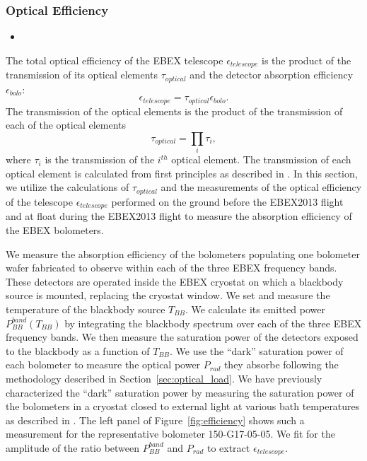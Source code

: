 \documentclass[../EBEXPaper2.tex]{subfiles}
\begin{document}
\subsubsection{Optical Efficiency}
\label{sec:optical_efficiency}

\begin{itemize}
\item {}
\end{itemize}

The total optical efficiency of the \ac{EBEX} telescope $\epsilon_{telescope}$ is the product of the transmission of its optical elements $\tau_{optical}$ and the detector absorption efficiency $\epsilon_{bolo}$:
\begin{equation}
\epsilon_{telescope} = \tau_{optical} \epsilon_{bolo}.
\label{eq:total_efficiency}
\end{equation}
The  transmission of the optical elements is the product of the transmission of each of the optical elements
\begin{equation}
\tau_{optical} = \prod_i \tau_i,
\label{eq:total_efficiency}
\end{equation}
where $\tau_i$ is the transmission of the $i^{th}$ optical element.
The transmission of each optical element is calculated from first principles as described in \citep{aubin_thesis}.
In this section, we utilize the calculations of $\tau_{optical}$ and the measurements of the optical efficiency of the telescope $\epsilon_{telescope}$ performed on the ground before the \ac{EBEX2013} flight and at float during the \ac{EBEX2013} flight to measure the absorption efficiency of the \ac{EBEX} bolometers.



We measure the absorption efficiency of the bolometers populating one bolometer wafer fabricated to observe within each of the three \ac{EBEX} frequency bands.
These detectors are operated inside the \ac{EBEX} cryostat on which a blackbody source is mounted, replacing the cryostat window.
We set and measure the temperature of the blackbody source $T_{BB}$.
We calculate its emitted power $P_{BB}^{band} (T_{BB})$ by integrating the blackbody spectrum over each of the three \ac{EBEX} frequency bands.
We then measure the saturation power of the detectors exposed to the blackbody as a function of $T_{BB}$.
We use the ``dark'' saturation power of each bolometer to measure the optical power $P_{rad}$ they absorbe following the methodology described in Section~\ref{sec:optical_load}.
We have previously characterized the ``dark'' saturation power by measuring the saturation power of the bolometers in a cryostat closed to external light at various bath temperatures as described in \citep{Aubin_TESReadout2010}.
The left panel of Figure~\ref{fig:efficiency} shows such a measurement for the representative bolometer 150-G17-05-05.
We fit for the amplitude of the ratio between $P_{BB}^{band}$ and $P_{rad}$ to extract $\epsilon_{telescope}$.
\end{document}
